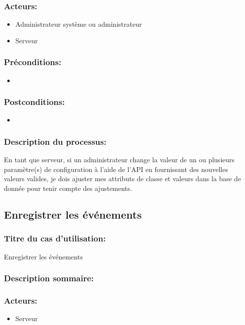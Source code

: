 \documentclass{scrreprt}
\begin{document}
\subsubsection{Acteurs:} 
\begin{itemize}
    \item Administrateur système ou administrateur
    \item Serveur
\end{itemize}
\subsubsection{Préconditions:}
\begin{itemize}
    \item  
\end{itemize} 
\subsubsection{Postconditions:}
\begin{itemize}
    \item  
\end{itemize} 
\subsubsection{Description du processus:}En tant que serveur, si un administrateur change la valeur de un ou plusieurs paramètre(s)
de configuration à l'aide de l'API en fournissant des nouvelles valeurs valides,
je dois ajuster mes attributs de classe et valeurs dans la base de donnée
pour tenir compte des ajustements.

\subsection{Enregistrer les événements}
\subsubsection{Titre du cas d'utilisation:} Enregistrer les événements
\subsubsection{Description sommaire:}
\subsubsection{Acteurs:}
\begin{itemize}
    \item Serveur
\end{itemize}
\end{document}
